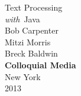 \cleardoublepage
\pagestyle{empty}
\vspace*{1in}
\begin{center}
{\hfill \fontsize{45}{65}\selectfont Text Processing \\[18pt] \hfill {\fontsize{30}{45}\it with}\ Java}
\\[1in]
{\hfill\Huge Bob Carpenter}
\\[12pt]
{\hfill\Huge Mitzi Morris}
\\[12pt]
{\hfill\Huge Breck Baldwin}
\\[-1pt]
\vfill
{\hfill \large\bf Colloquial Media}
\\[1pt]
{\hfill \small New York}
\\[-1pt]
{\hfill \small 2013}
\end{center}
